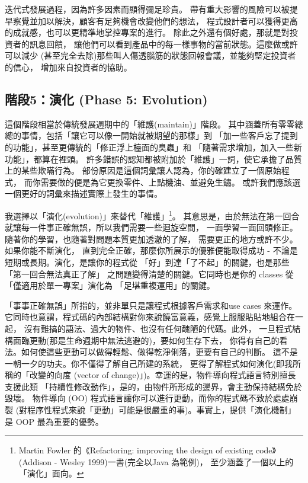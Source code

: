 迭代式發展過程，因為許多因素而顯得彌足珍貴。
帶有重大影響的風險可以被提早察覺並加以解決，顧客有足夠機會改變他們的想法，
程式設計者可以獲得更高的成就感，也可以更精準地掌控專案的進行。
除此之外還有個好處，那就是對投資者的訊息回饋，
讓他們可以看到產品中的每一樣事物的當前狀態。這麼做或許可以減少
(甚至完全去除)那些叫人傷透腦筋的狀態回報會議，並能夠堅定投資者的信心，
增加來自投資者的協助。

\subsection{階段5：演化 (Phase 5: Evolution)}
這個階段相當於傳統發展週期中的「維護(maintain)」階段。
其中涵蓋所有零零總總的事情，包括「讓它可以像一開始就被期望的那樣」到
「加一些客戶忘了提到的功能」，甚至更傳統的「修正浮上檯面的臭蟲」和
「隨著需求增加，加入一些新功能」，都算在裡頭。
許多錯誤的認知都被附加於「維護」一詞，使它承擔了品質上的某些欺瞞行為。
部份原因是這個詞彙讓人認為，你的確建立了一個原始程式，
而你需要做的便是為它更換零件、上點機油、並避免生鏽。
或許我們應該選一個更好的詞彙來描述實際上發生的事情。

我選擇以「演化(evolution)」來替代「維護」\footnote{Martin Fowler
的《Refactoring: improving the design of existing code》
(Addison - Wesley 1999)一書(完全以Java 為範例)，
至少涵蓋了一個以上的「演化」面向。}。
其意思是，由於無法在第一回合就讓每一件事正確無誤，所以我們需要一些迴旋空間，
一面學習一面回頭修正。隨著你的學習，也隨著對問題本質更加透澈的了解，
需要更正的地方或許不少。如果你能不斷演化，
直到完全正確，那麼你所展示的優雅便能取得成功 -
不論是短期或長期。演化，是讓你的程式從
「好」到達「了不起」的關鍵，也是那些「第一回合無法真正了解」
之問題變得清楚的關鍵。它同時也是你的 classes 從「僅適用於單一專案」演化為
「足堪重複運用」的關鍵。

「事事正確無誤」所指的，並非單只是讓程式根據客戶需求和use cases 來運作。
它同時也意謂，程式碼的內部結構對你來說饒富意義，感覺上服服貼貼地組合在一起，
沒有難搞的語法、過大的物件、也沒有任何醜陋的代碼。此外，
一旦程式結構面臨更動(那是生命週期中無法逃避的)，要如何生存下去，
你得有自己的看法。如何使這些更動可以做得輕鬆、做得乾淨俐落，更要有自己的判斷。
這不是一朝一夕的功夫。你不僅得了解自己所建的系統，
更得了解程式如何演化(即我所稱的「改變的向度
(vector of change)」)。幸運的是，物件導向程式語言特別擅長支援此類
「持續性修改動作」，是的，由物件所形成的邊界，會主動保持結構免於毀壞。
物件導向 (OO) 程式語言讓你可以進行更動，而你的程式碼不致於處處崩裂
(對程序性程式來說「更動」可能是很嚴重的事)。事實上，提供「演化機制」是
OOP 最為重要的優勢。

